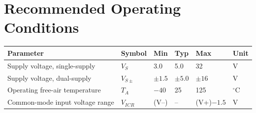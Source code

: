 \section{Recommended Operating Conditions}
\begin{center}
\begin{tabular}{@{}L{5.8cm}C{1.6cm}C{1.5cm}C{1.5cm}C{1.5cm}C{1.4cm}@{}}
\toprule
{}
{\footnotesize\bfseries Parameter} & {\footnotesize\bfseries Symbol} & {\footnotesize\bfseries Min} & {\footnotesize\bfseries Typ} & {\footnotesize\bfseries Max} & {\footnotesize\bfseries Unit} \\
\midrule
Supply voltage, single-supply        & $V_S$      & 3.0        & 5.0  & 32          & V \\
Supply voltage, dual-supply          & $V_{S\pm}$ & $\pm 1.5$  & $\pm 5.0$ & $\pm 16$ & V \\
Operating free-air temperature       & $T_A$      & $-40$      & 25   & 125         & $^{\circ}$C \\
Common-mode input voltage range      & $V_{ICR}$  & (V--)      & --   & (V+)$-1.5$  & V \\
\bottomrule
\end{tabular}
\end{center}

